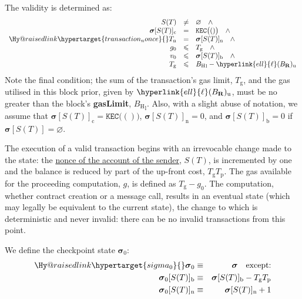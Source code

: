 \documentclass[9pt,oneside]{amsart}
\makeatletter
\newcommand{\linkdest}[1]{\Hy@raisedlink{\hypertarget{#1}{}}}
\makeatother
\begin{document}
\begin{multicols}{2}
The validity is determined as:
\begin{equation}
\begin{array}[t]{rcl}
S(T) & \neq & \varnothing \quad \wedge \\
\boldsymbol{\sigma}[S(T)]_{\mathrm{c}} & = & \texttt{KEC}\big( () \big) \quad \wedge \\
\linkdest{transaction_nonce}{}T_{\mathrm{n}} & = & \boldsymbol{\sigma}[S(T)]_{\mathrm{n}} \quad \wedge \\
g_0 & \leqslant & T_{\mathrm{g}} \quad \wedge \\
v_0 & \leqslant & \boldsymbol{\sigma}[S(T)]_{\mathrm{b}} \quad \wedge \\
T_{\mathrm{g}} & \leqslant & {B_{\mathrm{H}}}_{\mathrm{l}} - \hyperlink{ell}{\ell}(B_{\mathbf{R}})_{\mathrm{u}}
\end{array}
\end{equation}
Note the final condition; the sum of the transaction's gas limit, $T_{\mathrm{g}}$, and the gas utilised in this block prior, given by $\hyperlink{ell}{\ell}(B_{\mathbf{R}})_{\mathrm{u}}$, must be no greater than the block's \textbf{gasLimit}, ${B_{\mathrm{H}}}_{\mathrm{l}}$.
Also, with a slight abuse of notation, we assume that $\boldsymbol{\sigma}[S(T)]_{\mathrm{c}} = \texttt{KEC}\big( () \big)$, $\boldsymbol{\sigma}[S(T)]_{\mathrm{n}} = 0$, and $\boldsymbol{\sigma}[S(T)]_{\mathrm{b}} = 0$ if $\boldsymbol{\sigma}[S(T)] = \varnothing$.

The execution of a valid transaction begins with an irrevocable change made to the state: the \hyperlink{account_nonce}{nonce of the account of the sender}, $S(T)$, is incremented by one and the balance is reduced by part of the up-front cost, $T_{\mathrm{g}}T_{\mathrm{p}}$. The gas available for the proceeding computation, $g$, is defined as $T_{\mathrm{g}} - g_0$. The computation, whether contract creation or a message call, results in an eventual state (which may legally be equivalent to the current state), the change to which is deterministic and never invalid: there can be no invalid transactions from this point.

We define the checkpoint state $\boldsymbol{\sigma}_0$:
\begin{eqnarray}
\linkdest{sigma_0}{}\boldsymbol{\sigma}_0 & \equiv & \boldsymbol{\sigma} \quad \text{except:} \\
\boldsymbol{\sigma}_0[S(T)]_{\mathrm{b}} & \equiv & \boldsymbol{\sigma}[S(T)]_{\mathrm{b}} - T_{\mathrm{g}} T_{\mathrm{p}} \\
\boldsymbol{\sigma}_0[S(T)]_{\mathrm{n}} & \equiv & \boldsymbol{\sigma}[S(T)]_{\mathrm{n}} + 1
\end{eqnarray}


\end{multicols}
\end{document}
